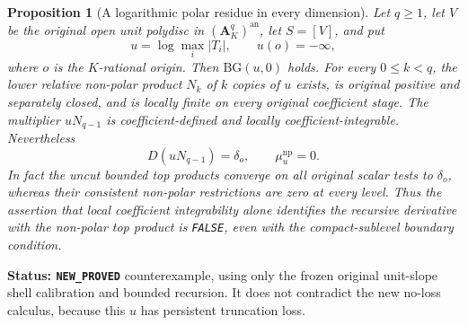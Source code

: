 \documentclass[11pt,a4paper]{article}
\numberwithin{equation}{section}
\newtheorem{proposition}[theorem]{Proposition}
\theoremstyle{definition}
\theoremstyle{remark}
\begin{document}
\begin{proposition}[A logarithmic polar residue in every dimension]
\label{prop:r11-logarithmic-recursive-residue}
Let $q\geq1$, let $V$ be the original open unit polydisc in
$(\mathbf A_K^q)^{\mathrm{an}}$, let $S=[V]$, and put
\[
                u=\log\max_i|T_i|,\qquad u(o)=-\infty,
 \tag{CR1}
\]
where $o$ is the $K$-rational origin. Then
$\mathrm{BG}(u,0)$ holds. For every $0\leq k<q$, the lower
relative non-polar product $N_k$ of $k$ copies of $u$ exists,
is original positive and separately closed, and is locally finite
on every original coefficient stage. The multiplier $uN_{q-1}$
is coefficient-defined and locally coefficient-integrable.
Nevertheless
\[
                    D(uN_{q-1})=\delta_o,
                    \qquad \mu_u^{\mathrm{np}}=0.
 \tag{CR2}
\]
In fact the uncut bounded top products converge on all original
scalar tests to $\delta_o$, whereas their consistent non-polar
restrictions are zero at every level.
Thus the assertion that local coefficient integrability alone
identifies the recursive derivative with the non-polar top product
is \texttt{FALSE}, even with the compact-sublevel boundary condition.
\end{proposition}

\noindent\textbf{Status: \texttt{NEW\_PROVED}} counterexample,
using only the frozen original unit-slope shell calibration and
bounded recursion. It does not contradict the new no-loss calculus,
because this $u$ has persistent truncation loss.
\end{document}
